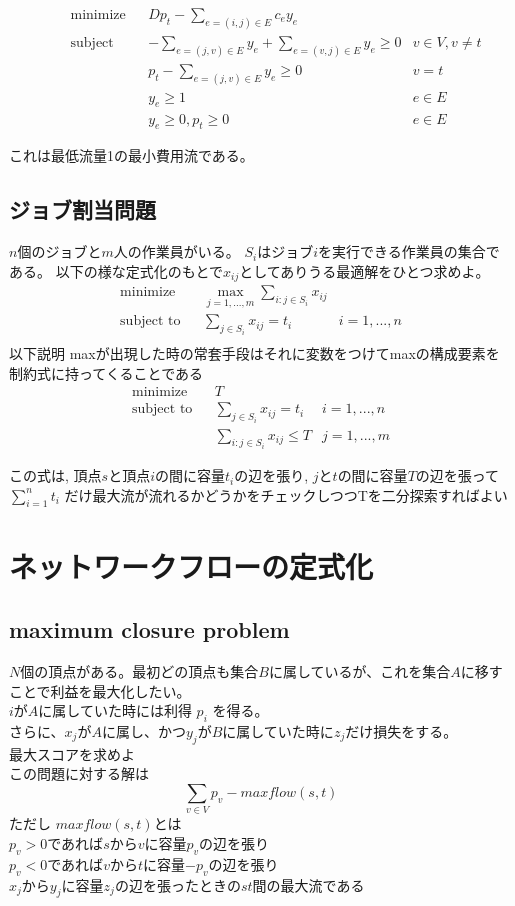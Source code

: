 \documentclass[13pt, a4paper, landscape]{jarticle}
\theoremstyle{nonitalic} %
\begin{document}
\begin{align}
  &&&&& \textrm{minimize}   && Dp_t - \sum_{e = (i,j )\in E} c_e y_e \\
  &&&&& \textrm{subject to} && -\sum_{e=(j,v) \in E} y_e + \sum_{e=(v,j) \in E} y_e \geq 0 & v \in V, v\neq t &&&&&\\
  &&&&&                     && p_t - \sum_{e=(j,v) \in E} y_e \geq 0 & v=t \\
  &&&&&                     && y_e \geq 1  & e \in E\\
  &&&&&                     && y_e \geq 0, p_t \geq 0 & e\in E
\end{align}


これは最低流量1の最小費用流である。

\subsection{ジョブ割当問題}
$n$個のジョブと$m$人の作業員がいる。
$S_i$はジョブ$i$を実行できる作業員の集合である。
以下の様な定式化のもとで$x_{ij}$としてありうる最適解をひとつ求めよ。
\begin{align}
  &&&&& \textrm{minimize}   && \max_{j=1,...,m} \sum_{i:j \in S_i} x_{ij} \\
  &&&&& \textrm{subject to} && \sum_{j \in S_i} x_{ij} = t_i  & i=1,...,n &&&&&\\
\end{align}
以下説明
maxが出現した時の常套手段はそれに変数をつけてmaxの構成要素を制約式に持ってくることである
\begin{align}
  &&&&& \textrm{minimize}   && T \\
  &&&&& \textrm{subject to} && \sum_{j \in S_i} x_{ij} = t_i  & i=1,...,n &&&&&\\
  &&&&&                     &&  \sum_{i:j \in S_i} x_{ij} \leq T & j=1,...,m
\end{align}

この式は, 頂点$s$と頂点$i$の間に容量$t_i$の辺を張り, $j$と$t$の間に容量$T$の辺を張って$\sum_{i=1}^n t_i $ だけ最大流が流れるかどうかをチェックしつつTを二分探索すればよい



\section{ネットワークフローの定式化}
\subsection{maximum closure problem}
$N$個の頂点がある。最初どの頂点も集合$B$に属しているが、これを集合$A$に移すことで利益を最大化したい。 \\
$i$が$A$に属していた時には利得 $p_i$ を得る。 \\
さらに、$x_j$が$A$に属し、かつ$y_j$が$B$に属していた時に$z_j$だけ損失をする。 \\
最大スコアを求めよ \\


この問題に対する解は
\[ \sum_{v \in V } p_v - maxflow(s,t) \]
ただし $maxflow(s,t) $とは\\
$p_v>0$であれば$s$から$v$に容量$p_v$の辺を張り\\
$p_v<0$であれば$v$から$t$に容量$-p_v$の辺を張り \\
$x_j$から$y_j$に容量$z_j$の辺を張ったときの$st$間の最大流である  
\end{document}
